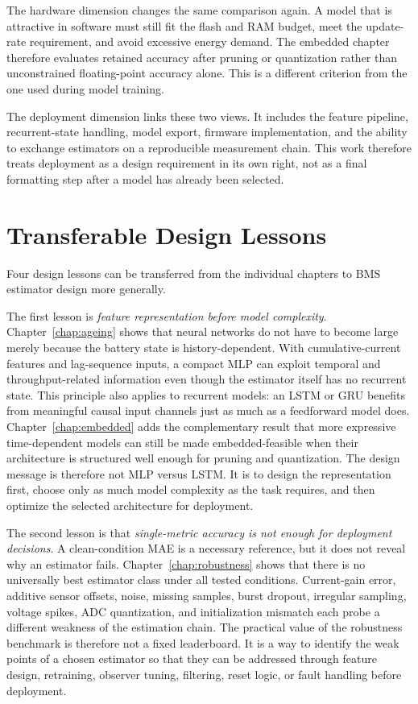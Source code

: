 \documentclass[
    a4paper,
    12pt,
    titlepage,
    bibliography=totoc,
    twoside=on,
    parskip=false,
    numbers=noenddot,
    cleardoublepage=empty,
    DIV=12,
    BCOR=12.0mm,
    headheight=36pt,
    headings=openright
]{scrreprt}
\begin{document}
The hardware dimension changes the same comparison again. A model that is attractive in software must still fit the flash and RAM budget, meet the update-rate requirement, and avoid excessive energy demand. The embedded chapter therefore evaluates retained accuracy after pruning or quantization rather than unconstrained floating-point accuracy alone. This is a different criterion from the one used during model training.

The deployment dimension links these two views. It includes the feature pipeline, recurrent-state handling, model export, firmware implementation, and the ability to exchange estimators on a reproducible measurement chain. This work therefore treats deployment as a design requirement in its own right, not as a final formatting step after a model has already been selected.

\section{Transferable Design Lessons}
Four design lessons can be transferred from the individual chapters to BMS estimator design more generally.

The first lesson is \emph{feature representation before model complexity}. Chapter~\ref{chap:ageing} shows that neural networks do not have to become large merely because the battery state is history-dependent. With cumulative-current features and lag-sequence inputs, a compact MLP can exploit temporal and throughput-related information even though the estimator itself has no recurrent state. This principle also applies to recurrent models: an LSTM or GRU benefits from meaningful causal input channels just as much as a feedforward model does. Chapter~\ref{chap:embedded} adds the complementary result that more expressive time-dependent models can still be made embedded-feasible when their architecture is structured well enough for pruning and quantization. The design message is therefore not MLP versus LSTM. It is to design the representation first, choose only as much model complexity as the task requires, and then optimize the selected architecture for deployment.

The second lesson is that \emph{single-metric accuracy is not enough for deployment decisions}. A clean-condition MAE is a necessary reference, but it does not reveal why an estimator fails. Chapter~\ref{chap:robustness} shows that there is no universally best estimator class under all tested conditions. Current-gain error, additive sensor offsets, noise, missing samples, burst dropout, irregular sampling, voltage spikes, ADC quantization, and initialization mismatch each probe a different weakness of the estimation chain. The practical value of the robustness benchmark is therefore not a fixed leaderboard. It is a way to identify the weak points of a chosen estimator so that they can be addressed through feature design, retraining, observer tuning, filtering, reset logic, or fault handling before deployment.
\end{document}
